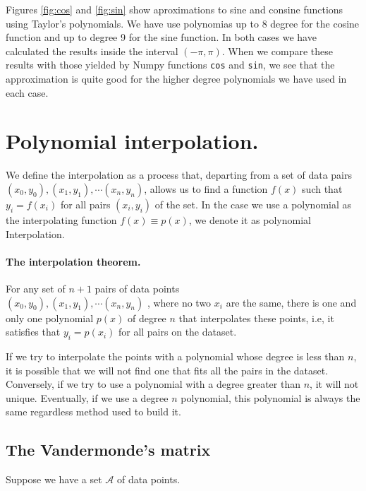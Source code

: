 \begin{paracol}{2}
\switchcolumn
Figures \ref{fig:cos} and \ref{fig:sin} show aproximations to sine and consine functions using Taylor's polynomials. We have use polynomias up to 8 degree for the cosine function and up to degree 9 for the sine function. In both cases we have calculated the results inside the interval $(-\pi, \pi)$. When we compare these results with those yielded by Numpy functions \texttt{cos} and \texttt{sin}, we see that the approximation is quite good for the higher degree  polynomials we have used in each case.

\section{Polynomial interpolati\-on.}
We define the interpolation as a process that, departing from a set of data pairs \\ $(x_0,y_0),(x_1,y_1), \cdots (x_n,y_n)$, allows us to find a function $f(x)$ such that $y_i = f(x_i)$ for all pairs $(x_i,y_i)$ of the set. In the case we use a polynomial as the interpolating function $f(x)\equiv p(x)$, we denote it as polynomial Interpolation. 

\paragraph{The interpolation theorem.}
For any set of $n+1$ pairs of data points\\ $(x_0,y_0) ,(x_1,y_1),\cdots (x_n,y_n)$ , where no two $x_i$ are the same, there is one and only one polynomial $p(x)$ of degree $n$ that interpolates these points, i.e, it satisfies that $y_i=p(x_i)$ for all pairs on the dataset.

If we try to interpolate the points with a polynomial whose degree is less than $n$, it is possible that we will not find one that fits all the pairs in the dataset. Conversely, if we try to use a polynomial with a degree greater than $n$, it will not unique. Eventually, if we use a degree $n$ polynomial, this polynomial is always the same regardless method used to build it.        

\subsection{The Vandermonde's matrix}
Suppose we have a set $\mathcal{A}$ of data points.
\end{paracol}
